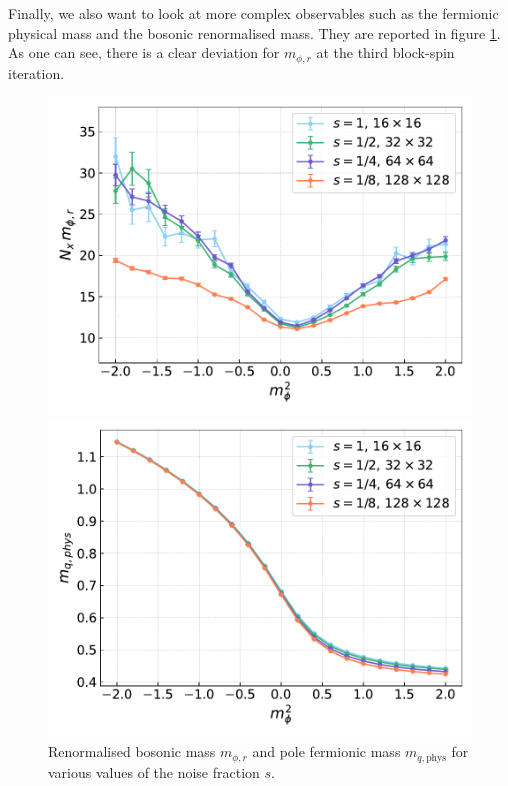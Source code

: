 \newpage
Finally, we also want to look at more complex observables such as the fermionic physical mass and the bosonic renormalised mass. They are reported in figure \ref{fig:cooling_masses}. As one can see, there is a clear deviation for $m_{\phi, r}$ at the third block-spin iteration.
\begin{figure}[h!]
    \begin{minipage}{0.45\textwidth}
        \includegraphics[scale=0.45]{figures/cooling/mass_scan/mphir.pdf}
    \end{minipage}
    \hfill 
    \begin{minipage}{0.45\textwidth}
        \includegraphics[scale=0.45]{figures/cooling/mass_scan/mqphys.pdf}
    \end{minipage}
    \caption[Masses in the cooling procedure]{Renormalised bosonic mass $m_{\phi, r}$ and pole fermionic mass $m_{q,\text{phys}}$ for various values of the noise fraction $s$.}
    \label{fig:cooling_masses}
\end{figure} 

